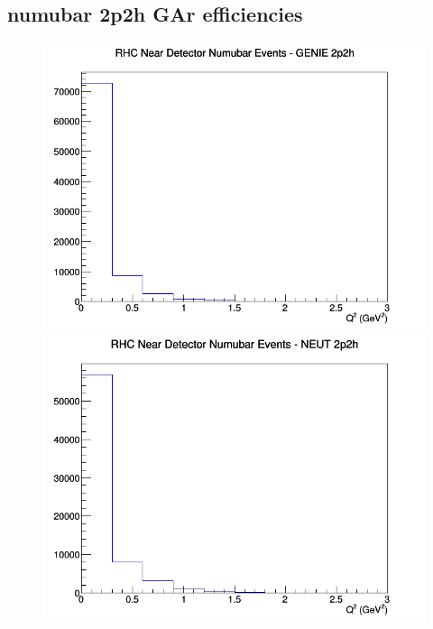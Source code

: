 \subsection{numubar 2p2h GAr efficiencies}
\begin{figure}[h]
\includegraphics[width=\linewidth]{eff_Q2/GAr/2p2h_RHC_ND_numubar_Q2_GENIE.png}
\endminipage
{}
\includegraphics[width=\linewidth]{eff_Q2/GAr/2p2h_RHC_ND_numubar_Q2_NEUT.png}
\endminipage
{}

\end{figure}

